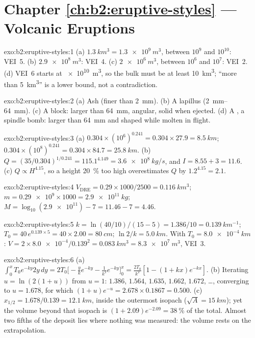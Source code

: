 \section*{Chapter \ref{ch:b2:eruptive-styles} --- Volcanic Eruptions}

\begin{solution}{exo:b2:eruptive-styles:1}
(a) $\qty{1.3}{km^3} = \qty{1.3e9}{m^3}$, between $10^9$ and $10^{10}$: VEI~5.
(b) $\qty{2.9e8}{m^3}$: VEI~4. (c) $\qty{2e6}{m^3}$, between $10^6$ and $10^7$:
VEI~2. (d) VEI~6 starts at \qty{e10}{m^3}, so the bulk  must be at least
\qty{10}{km^3}; ``more than \qty{5}{km^3}'' is a lower bound, not a contradiction.
\end{solution}

\begin{solution}{exo:b2:eruptive-styles:2}
(a) Ash (finer than \qty{2}{mm}). (b) A lapillus (\qtyrange{2}{64}{mm}).
(c) A block: larger than \qty{64}{mm}, angular, solid when ejected. (d) A
, a spindle bomb: larger than \qty{64}{mm} and shaped while molten
in flight.
\end{solution}

\begin{solution}{exo:b2:eruptive-styles:3}
(a) $0.304\times(10^6)^{0.241} = 0.304\times27.9 = \qty{8.5}{km}$;
$0.304\times(10^8)^{0.241} = 0.304\times84.7 = \qty{25.8}{km}$.
(b) $Q = (35/0.304)^{1/0.241} = 115.1^{4.149} = \qty{3.6e8}{kg/s}$, and $I =
8.55 + 3 = 11.6$. (c) $Q \propto H^{4.15}$, so a height \qty{20}{\percent} too high
overestimates $Q$ by $1.2^{4.15} = 2.1$.
\end{solution}

\begin{solution}{exo:b2:eruptive-styles:4}
$V_{\mathrm{DRE}} = 0.29\times1000/2500 = \qty{0.116}{km^3}$; $m =
\num{0.29e9}\times1000 = \qty{2.9e11}{kg}$; $M = \log_{10}(\num{2.9e11}) - 7 = 11.46
- 7 = 4.46$.
\end{solution}

\begin{solution}{exo:b2:eruptive-styles:5}
$k = \ln(40/10)/(15 - 5) = 1.386/10 = \qty{0.139}{km^{-1}}$; $T_0 = 40\,e^{0.139\times5}
= 40\times2.00 = \qty{80}{cm}$; $\ln2/k = \qty{5.0}{km}$. With $T_0 =
\qty{8.0e-4}{km}$: $V = 2\times\num{8.0e-4}/0.139^2 = \qty{0.083}{km^3} =
\qty{8.3e7}{m^3}$, VEI~3.
\end{solution}

\begin{solution}{exo:b2:eruptive-styles:6}
(a) $\int_0^x T_0e^{-ky}2y\,dy = 2T_0\big[-\tfrac{y}{k}e^{-ky} - \tfrac{1}{k^2}e^{-ky}\big]_0^x
= \tfrac{2T_0}{k^2}[1 - (1 + kx)e^{-kx}]$. (b) Iterating $u = \ln(2(1 + u))$ from
$u = 1$: $1.386$, $1.564$, $1.635$, $1.662$, $1.672$, \dots, converging to
$u = 1.678$, for which $(1 + u)e^{-u} = 2.678\times0.1867 = 0.500$. (c) $x_{1/2} =
1.678/0.139 = \qty{12.1}{km}$, inside the outermost isopach ($\sqrt A =
\qty{15}{km}$); yet the volume beyond that isopach is $(1 + 2.09)e^{-2.09} =
\qty{38}{\percent}$ of the total. Almost two fifths of the deposit lies where
nothing was measured: the volume rests on the extrapolation.
\end{solution}


